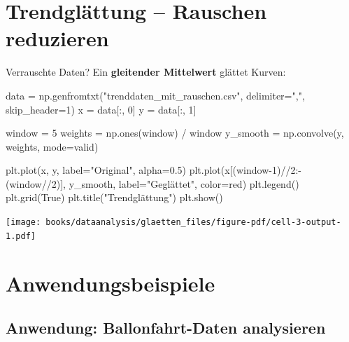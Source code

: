 \documentclass[
  letterpaper,
  DIV=11,
  numbers=noendperiod]{scrreprt}
\newenvironment{Shaded}{\begin{snugshade}}{\end{snugshade}}
\newcommand{\DecValTok}[1]{\textcolor[rgb]{0.68,0.00,0.00}{#1}}
\newcommand{\FloatTok}[1]{\textcolor[rgb]{0.68,0.00,0.00}{#1}}
\newcommand{\NormalTok}[1]{\textcolor[rgb]{0.00,0.23,0.31}{#1}}
\newcommand{\OperatorTok}[1]{\textcolor[rgb]{0.37,0.37,0.37}{#1}}
\newcommand{\StringTok}[1]{\textcolor[rgb]{0.13,0.47,0.30}{#1}}
\newcommand{\VariableTok}[1]{\textcolor[rgb]{0.07,0.07,0.07}{#1}}
\begin{document}
\chapter{Trendglättung -- Rauschen
reduzieren}\label{trendgluxe4ttung-rauschen-reduzieren}

Verrauschte Daten? Ein \textbf{gleitender Mittelwert} glättet Kurven:

\begin{Shaded}
\begin{Highlighting}[]
\NormalTok{data }\OperatorTok{=}\NormalTok{ np.genfromtxt(}\StringTok{"trenddaten\_mit\_rauschen.csv"}\NormalTok{, delimiter}\OperatorTok{=}\StringTok{","}\NormalTok{, skip\_header}\OperatorTok{=}\DecValTok{1}\NormalTok{)}
\NormalTok{x }\OperatorTok{=}\NormalTok{ data[:, }\DecValTok{0}\NormalTok{]}
\NormalTok{y }\OperatorTok{=}\NormalTok{ data[:, }\DecValTok{1}\NormalTok{]}

\NormalTok{window }\OperatorTok{=} \DecValTok{5}
\NormalTok{weights }\OperatorTok{=}\NormalTok{ np.ones(window) }\OperatorTok{/}\NormalTok{ window}
\NormalTok{y\_smooth }\OperatorTok{=}\NormalTok{ np.convolve(y, weights, mode}\OperatorTok{=}\StringTok{\textquotesingle{}valid\textquotesingle{}}\NormalTok{)}

\NormalTok{plt.plot(x, y, label}\OperatorTok{=}\StringTok{"Original"}\NormalTok{, alpha}\OperatorTok{=}\FloatTok{0.5}\NormalTok{)}
\NormalTok{plt.plot(x[(window}\OperatorTok{{-}}\DecValTok{1}\NormalTok{)}\OperatorTok{//}\DecValTok{2}\NormalTok{:}\OperatorTok{{-}}\NormalTok{(window}\OperatorTok{//}\DecValTok{2}\NormalTok{)], y\_smooth, label}\OperatorTok{=}\StringTok{"Geglättet"}\NormalTok{, color}\OperatorTok{=}\StringTok{\textquotesingle{}red\textquotesingle{}}\NormalTok{)}
\NormalTok{plt.legend()}
\NormalTok{plt.grid(}\VariableTok{True}\NormalTok{)}
\NormalTok{plt.title(}\StringTok{"Trendglättung"}\NormalTok{)}
\NormalTok{plt.show()}
\end{Highlighting}
\end{Shaded}

\texttt{[image: books/dataanalysis/glaetten\_files/figure-pdf/cell-3-output-1.pdf]}

\chapter{Anwendungsbeispiele}\label{anwendungsbeispiele}

\section{Anwendung: Ballonfahrt-Daten
analysieren}\label{anwendung-ballonfahrt-daten-analysieren}
\end{document}
